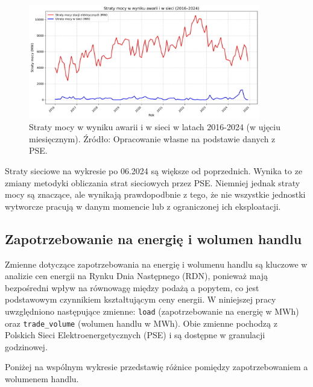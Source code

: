 \begin{figure}[h]
    \centering
    \includegraphics[width=0.9\textwidth]{../plots/losses/power_losses_2016_2024.png}
    \caption{Straty mocy w wyniku awarii i w sieci w latach 2016-2024 (w ujęciu miesięcznym). Źródło: Opracowanie własne na podstawie danych z PSE.}
    \label{fig:power_losses}
\end{figure}

Straty sieciowe na wykresie po 06.2024 są większe od poprzednich. Wynika to ze zmiany metodyki obliczania strat sieciowych przez PSE. Niemniej jednak straty mocy są znaczące, ale wynikają prawdopodbnie z tego, że nie wszystkie jednostki wytworcze pracują w danym momencie lub z ograniczonej ich eksploatacji. 

\subsection{Zapotrzebowanie na energię i wolumen handlu}
\label{subsec:demand}

Zmienne dotyczące zapotrzebowania na energię i wolumenu handlu są kluczowe w analizie cen energii na Rynku Dnia Następnego (RDN), ponieważ mają bezpośredni wpływ na równowagę między podażą a popytem, co jest podstawowym czynnikiem kształtującym ceny energii. W niniejszej pracy uwzględniono następujące zmienne: \texttt{load} (zapotrzebowanie na energię w MWh) oraz \texttt{trade\_volume} (wolumen handlu w MWh). Obie zmienne pochodzą z Polskich Sieci Elektroenergetycznych (PSE) i są dostępne w granulacji godzinowej.

Poniżej na wspólnym wykresie przedstawię różnice pomiędzy zapotrzebowaniem a wolumenem handlu.

